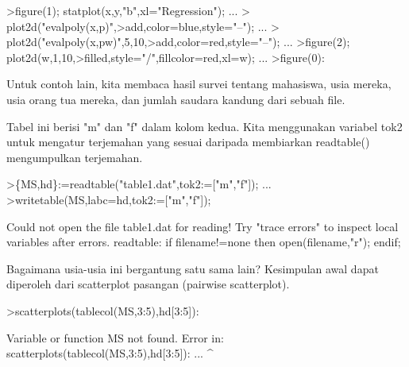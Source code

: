 \documentclass[12pt,arial,letterpaper]{book}
\begin{document}
\begin{eulercomment}
\begin{eulercomment}
\begin{eulercomment}
\begin{eulercomment}
\begin{eulercomment}
\begin{eulercomment}
\begin{eulercomment}
\begin{eulercomment}
\begin{eulercomment}
\begin{eulercomment}
\begin{eulercomment}
\begin{eulercomment}
\begin{eulercomment}
\begin{eulercomment}
\begin{eulercomment}
\begin{eulercomment}
\begin{eulercomment}
\begin{eulercomment}
\begin{eulercomment}
\begin{eulercomment}
\begin{eulercomment}
\begin{eulercomment}
\begin{eulercomment}
\begin{eulercomment}
\begin{eulercomment}
\begin{eulercomment}
\begin{eulercomment}
\begin{eulercomment}
\begin{eulercomment}
\begin{eulercomment}
\begin{eulercomment}
\begin{eulercomment}
\begin{eulerprompt}
>figure(1); statplot(x,y,"b",xl="Regression"); ...
>  plot2d("evalpoly(x,p)",>add,color=blue,style="--"); ...
>  plot2d("evalpoly(x,pw)",5,10,>add,color=red,style="--"); ...
>figure(2); plot2d(w,1,10,>filled,style="/",fillcolor=red,xl=w); ...
>figure(0):
\end{eulerprompt}
\begin{eulercomment}
Untuk contoh lain, kita membaca hasil survei tentang mahasiswa, usia
mereka, usia orang tua mereka, dan jumlah saudara kandung dari sebuah
file.

Tabel ini berisi "m" dan "f" dalam kolom kedua. Kita menggunakan
variabel tok2 untuk mengatur terjemahan yang sesuai daripada
membiarkan readtable() mengumpulkan terjemahan.
\end{eulercomment}
\begin{eulerprompt}
>\{MS,hd\}:=readtable("table1.dat",tok2:=["m","f"]);  ...
>writetable(MS,labc=hd,tok2:=["m","f"]);
\end{eulerprompt}
\begin{euleroutput}
  Could not open the file
  table1.dat
  for reading!
  Try "trace errors" to inspect local variables after errors.
  readtable:
      if filename!=none then open(filename,"r"); endif;
\end{euleroutput}
\begin{eulercomment}
Bagaimana usia-usia ini bergantung satu sama lain? Kesimpulan awal
dapat diperoleh dari scatterplot pasangan (pairwise scatterplot).
\end{eulercomment}
\begin{eulerprompt}
>scatterplots(tablecol(MS,3:5),hd[3:5]):
\end{eulerprompt}
\begin{euleroutput}
  Variable or function MS not found.
  Error in:
  scatterplots(tablecol(MS,3:5),hd[3:5]): ...
                          ^
\end{euleroutput}

\end{eulercomment}
\end{eulercomment}
\end{eulercomment}
\end{eulercomment}
\end{eulercomment}
\end{eulercomment}
\end{eulercomment}
\end{eulercomment}
\end{eulercomment}
\end{eulercomment}
\end{eulercomment}
\end{eulercomment}
\end{eulercomment}
\end{eulercomment}
\end{eulercomment}
\end{eulercomment}
\end{eulercomment}
\end{eulercomment}
\end{eulercomment}
\end{eulercomment}
\end{eulercomment}
\end{eulercomment}
\end{eulercomment}
\end{eulercomment}
\end{eulercomment}
\end{eulercomment}
\end{eulercomment}
\end{eulercomment}
\end{eulercomment}
\end{eulercomment}
\end{eulercomment}
\end{eulercomment}
\end{document}
